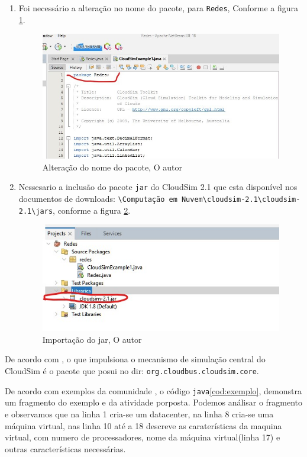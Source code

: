 \begin{enumerate}[label=\Roman{*}, ref=(\roman{*})]
  \item Foi necessário a alteração no nome do pacote, para \verb#Redes#, Conforme a figura \ref{fig:rename_pacote}. \newline
  \begin{figure}[h]
    \center
    \includegraphics[scale=.5]{figure/rename_pacote.jpg}
    \caption{Alteração do nome do pacote, O autor}
    \label{fig:rename_pacote}
  \end{figure}

  \item Nessesario a inclusão do pacote \verb#jar# do CloudSim 2.1 que esta disponível nos documentos de downloads: \verb#\Computação em Nuvem\cloudsim-2.1\cloudsim-2.1\jars#, conforme a figura \ref{fig:import_jar}. \newline
  \begin{figure}[h]
    \center
    \includegraphics[scale=.8]{figure/import_jar.jpg}
    \caption{Importação do jar, O autor}
    \label{fig:import_jar}
  \end{figure}
\end{enumerate}


\par De acordo com , o que impulsiona o mecanismo de simulação central do CloudSim é o pacote que posui no dir: \verb#org.cloudbus.cloudsim.core#.
\par De acordo com exemplos da comunidade , o código \verb#java#\ref{cod:exemplo}, demonstra um fragmento do exemplo e da atividade porposta. Podemos análisar o fragmento e observamos que na linha 1 cria-se um datacenter, na linha 8 cria-se uma máquina virtual, nas linha 10 até a 18 descreve as caraterísticas da maquina virtual, com numero de processadores, nome da máquina virtual(linha 17) e outras características necessárias.

